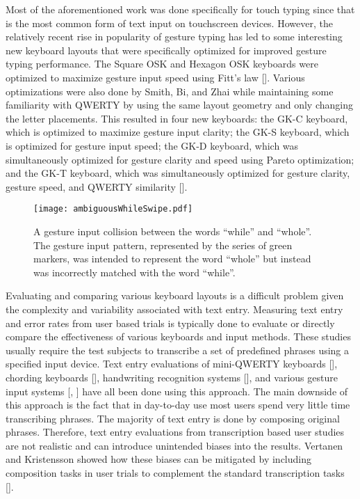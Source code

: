 \documentclass[final,1p,times,authoryear]{elsarticle}
\begin{document}
Most of the aforementioned work was done specifically for touch typing since that is the most
common form of text input on touchscreen devices. However, the relatively recent rise in popularity of 
gesture typing has led to some interesting new keyboard layouts that were specifically optimized for
improved gesture typing performance. The Square OSK and Hexagon OSK keyboards were optimized
to maximize gesture input speed using Fitt's law [\cite{fastSwiping}]. Various optimizations were also
done by Smith, Bi, and Zhai while maintaining some familiarity with QWERTY by using the same layout 
geometry and only changing the letter placements. This resulted in four new keyboards: the GK-C keyboard,
which is optimized to maximize gesture input clarity; the GK-S keyboard, which is optimized for gesture input
speed; the GK-D keyboard, which was simultaneously optimized for gesture clarity and speed using Pareto
optimization; and the GK-T keyboard, which was simultaneously optimized for gesture clarity, gesture speed, 
and QWERTY similarity [\cite{googleKeyboard}].

\begin{figure}[tbh]
\begin{centering}
\texttt{[image: ambiguousWhileSwipe.pdf]}
\par\end{centering}
\protect\caption{A gesture input collision between the words ``while'' and ``whole''. The
gesture input pattern, represented by the series of green markers, was intended
to represent the word ``whole'' but instead was incorrectly matched
with the word ``while''.  \label{fig:Example-swipe-collision}}
\end{figure}

Evaluating and comparing various keyboard layouts is a difficult problem given the complexity and variability associated with text entry.
Measuring text entry and error rates from user based trials is typically done to evaluate or directly compare the effectiveness of various keyboards and input methods.
These studies usually require the test subjects to transcribe a set of predefined phrases using a specified input device.
Text entry evaluations of mini-QWERTY keyboards [\cite{miniQWERTY}], chording keyboards [\cite{twiddler}], handwriting recognition systems [\cite{handwriting}], and various gesture input systems [\cite{graffiti}, \cite{joystick}] have all been done using this approach.
The main downside of this approach is the fact that in day-to-day use most users spend very little time transcribing phrases.
The majority of text entry is done by composing original phrases.
Therefore, text entry evaluations from transcription based user studies are not realistic and can introduce unintended biases into the results.
Vertanen and Kristensson showed how these biases can be mitigated by including composition tasks in user trials to complement the standard transcription tasks [\cite{composition}].
\end{document}
